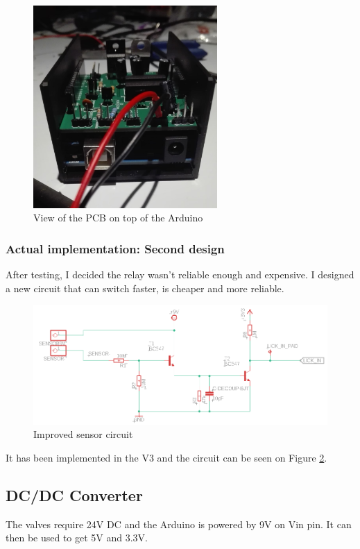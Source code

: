 \documentclass[a4paper]{article}
\begin{document}
\begin{figure}[h!b!t!]
    \centering
    \includegraphics[width=7cm]{images/enclosure.jpg}
    \caption{View of the PCB on top of the Arduino}
    \label{fig:my_label}
\end{figure}

\subsubsection{Actual implementation: Second design}
After testing, I decided the relay wasn't reliable enough and expensive.
I designed a new circuit that can switch faster, is cheaper and more reliable.

\begin{figure}[h!]
    \centering
    \includegraphics[width = 10 cm]{images/sensorv3.png}
    \caption{Improved sensor circuit}
    \label{fig:sensorv3}
\end{figure}

It has been implemented in the V3 and the circuit can be seen on Figure \ref{fig:sensorv3}.

\subsection{DC/DC Converter}
The valves require 24V DC and the Arduino is powered by 9V on Vin pin. It can then be used to get 5V and 3.3V.
\end{document}
